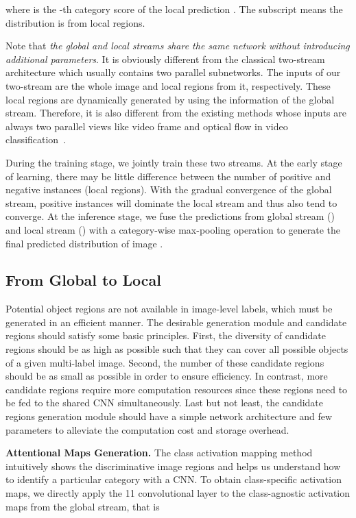 \documentclass[journal]{IEEEtran}
\begin{document}
where  is the -th category score of the local prediction . The subscript  means the distribution is from  local regions.

Note that \emph{the global and local streams share the same network without introducing additional parameters}. It is obviously different from the classical two-stream architecture which usually contains two parallel subnetworks. The inputs of our two-stream are the whole image and local regions from it, respectively. These local regions are dynamically generated by using the information of the global stream. Therefore, it is also different from the existing methods whose inputs are always two parallel views like video frame and optical flow in video classification~\cite{Simonyan14}.

During the training stage, we jointly train these two streams. At the early stage of learning, there may be little difference between the number of positive and negative instances (local regions). With the gradual convergence of the global stream, positive instances will dominate the local stream and thus also tend to converge.  At the inference stage, we fuse the predictions from global stream () and local stream () with a category-wise max-pooling operation to generate the final predicted distribution of image .

 
\subsection{From Global to Local}
Potential object regions are not available in image-level labels, which must be generated in an efficient manner. The desirable generation module and candidate regions should satisfy some basic principles. First, the diversity of candidate regions should be as high as possible such that they can cover all possible objects of a given multi-label image. Second, the number of these candidate regions should be as small as possible in order to ensure efficiency. In contrast, more candidate regions require more computation resources since these regions need to be fed to the shared CNN simultaneously. Last but not least, the candidate regions generation module should have a simple network architecture and few parameters to alleviate the computation cost and storage overhead.

\noindent \textbf{Attentional Maps Generation.} 
The class activation mapping method~\cite{zhou2016learning} intuitively shows the discriminative image regions and helps us understand how to identify a particular category with a CNN.  To obtain class-specific activation maps, we directly apply the 11 convolutional layer to the class-agnostic activation maps  from the global stream, that is
 
\end{document}
